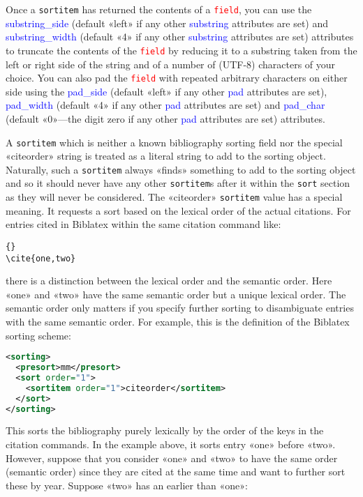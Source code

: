 \documentclass{ltxdockit}
\newcommand*{\biblatex}{Biblatex\xspace}
\begin{document}
Once a \texttt{sortitem} has returned the contents of a
\textcolor{red}{\texttt{field}}, you can use the
\textcolor{blue}{substring\_side} (default «left» if any other
\textcolor{blue}{substring} attributes are set) and
\textcolor{blue}{substring\_width} (default «4» if any other
\textcolor{blue}{substring} attributes are set) attributes to truncate the
contents of the \textcolor{red}{\texttt{field}} by reducing it to a
substring taken from the left or right side of the string and of a number
of (UTF-8) characters of your choice. You can also pad the
\textcolor{red}{\texttt{field}} with repeated arbitrary characters on
either side using the \textcolor{blue}{pad\_side} (default «left» if any other
\textcolor{blue}{pad} attributes are set),
\textcolor{blue}{pad\_width} (default «4» if any other
\textcolor{blue}{pad} attributes are set) and \textcolor{blue}{pad\_char}
(default «0»---the digit zero if any other
\textcolor{blue}{pad} attributes are set) attributes.

A \texttt{sortitem} which is neither a known bibliography sorting field nor
the special «citeorder» string is treated as a literal string to add to the
sorting object. Naturally, such a \texttt{sortitem} always «finds»
something to add to the sorting object and so it should never have any
other \texttt{sortitem}s after it within the \texttt{sort} section as they
will never be considered. The «citeorder» \texttt{sortitem} value has a
special meaning. It requests a sort based on the lexical order of the
actual citations. For entries cited in \biblatex within the same citation
command like:

\begin{lstlisting}[style=latex]{}
\cite{one,two}
\end{lstlisting}
%
there is a distinction between the lexical order and the semantic order.
Here «one» and «two» have the same semantic order but a unique lexical
order. The semantic order only matters if you specify further sorting to
disambiguate entries with the same semantic order. For example, this is the
definition of the \biblatex {} sorting scheme: 

\begin{lstlisting}[language=xml,escapechar=+,mathescape=true]
<sorting>
  <presort>mm</presort>
  <sort order="1">
    <sortitem order="1">citeorder</sortitem>
  </sort>
</sorting>
\end{lstlisting}
%
This sorts the bibliography purely lexically by the order of the keys in
the citation commands. In the example above, it sorts entry «one» before «two».
However, suppose that you consider «one» and «two» to have the same order
(semantic order) since they are cited at the same time and want to further
sort these by year. Suppose «two» has an earlier  than
«one»:
\end{document}
